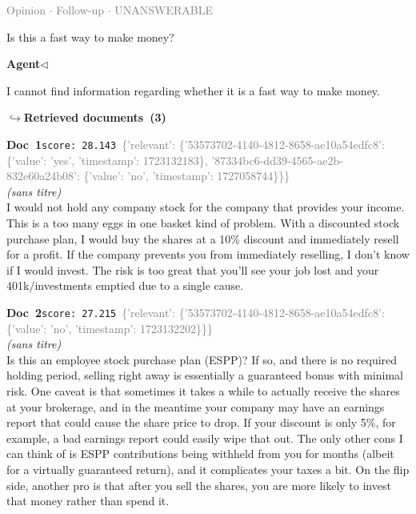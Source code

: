 \documentclass[a4paper,11pt]{article}
\begin{document}
\hfill{\tiny\textcolor{gray}{Opinion $\cdot$ Follow-up $\cdot$ UNANSWERABLE}}
\begin{userbubble}
Is this a fast way to make money?
\end{userbubble}
\noindent\hfill{\small\textcolor{agentcolor}{\textbf{Agent\enspace$\triangleleft$}}}
\begin{agentbubble}
I cannot find information regarding whether it is a fast way to make money.
\end{agentbubble}
\noindent\hfill{\footnotesize\textcolor{doccolor}{\textbf{$\hookrightarrow$\enspace Retrieved documents~(3)}}}
\begin{docenv}
{\footnotesize\textcolor{doccolor}{\textbf{Doc~1}}}\hfill{\tiny\texttt{score:~28.143}}\ {\tiny\textcolor{gray}{\{'relevant': \{'53573702-4140-4812-8658-ae10a54edfc8': \{'value': 'yes', 'timestamp': 1723132183\}, '87334bc6-dd39-4565-ae2b-832e60a24b08': \{'value': 'no', 'timestamp': 1727058744\}\}\}}}\\[3pt]
{\small\textit{(sans titre)}}\\[2pt]
\vspace{2pt}
{\footnotesize 
I would not hold any company stock for the company that provides your income.   This is a too many eggs in one basket kind of problem. With a discounted stock purchase plan, I would buy the shares at a 10\% discount and immediately resell for a profit.   If the company prevents you from immediately reselling, I  don't know if I would invest. The risk is too great that you'll see your job lost and your 401k/investments emptied due to a single cause.}
\end{docenv}
\begin{docenv}
{\footnotesize\textcolor{doccolor}{\textbf{Doc~2}}}\hfill{\tiny\texttt{score:~27.215}}\ {\tiny\textcolor{gray}{\{'relevant': \{'53573702-4140-4812-8658-ae10a54edfc8': \{'value': 'no', 'timestamp': 1723132202\}\}\}}}\\[3pt]
{\small\textit{(sans titre)}}\\[2pt]
\vspace{2pt}
{\footnotesize 
Is this an employee stock purchase plan (ESPP)? If so, and there is no required holding period, selling right away is essentially a guaranteed bonus with minimal risk. One caveat is that sometimes it takes a while to actually receive the shares at your brokerage, and in the meantime your company may have an earnings report that could cause the share price to drop. If your discount is only 5\%, for example, a bad earnings report could easily wipe that out. The only other cons I can think of is ESPP contributions being withheld from you for months (albeit for a virtually guaranteed return), and it complicates your taxes a bit. On the flip side, another pro is that after you sell the shares, you are more likely to invest that money rather than spend it.}
\end{docenv}
\end{document}
